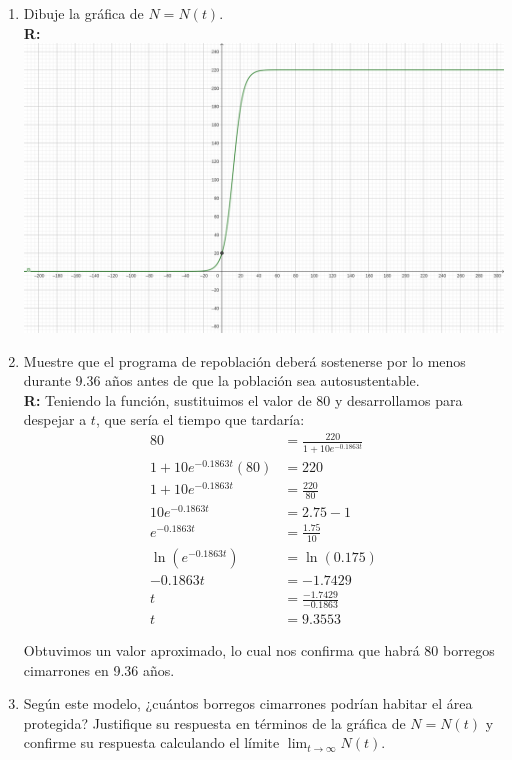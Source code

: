 \documentclass[12pt]{article}
\begin{document}
\begin{enumerate}
    \item Dibuje la gráfica de \( N = N(t) \).\\
    {\bf R:}\\
    \includegraphics[width=1\textwidth, center]{graficaborregos.png}
    
    \item Muestre que el programa de repoblación deberá sostenerse por lo menos durante 9.36 años antes de que la población sea autosustentable.\\
    {\bf R:} Teniendo la función, sustituimos el valor de 80 y desarrollamos para despejar a $t$, que sería el tiempo que tardaría:\\
    \begin{align*}
        80 &= \frac{220}{1 + 10 e^{-0.1863 t}}\\
        1 + 10 e^{-0.1863 t}(80) &= 220 \\
        1 + 10 e^{-0.1863 t} &= \frac{220}{80} \\
        10 e^{-0.1863 t} &= 2.75 -1 \\
        e^{-0.1863 t} &= \frac{1.75}{10} \\
    \ln (e^{-0.1863 t}) &= \ln (0.175) \\
        -0.1863 t &= -1.7429\\
        t &= \frac{-1.7429}{-0.1863}\\
        t&=9.3553
    \end{align*}
    
    Obtuvimos un valor aproximado, lo cual nos confirma que habrá 80 borregos cimarrones en 9.36 años.
    
    \item Según este modelo, ¿cuántos borregos cimarrones podrían habitar el área protegida? Justifique su respuesta en términos de la gráfica de \( N = N(t) \) y confirme su respuesta calculando el límite \( \lim_{t \to \infty} N(t) \).
\end{enumerate}
\end{document}
